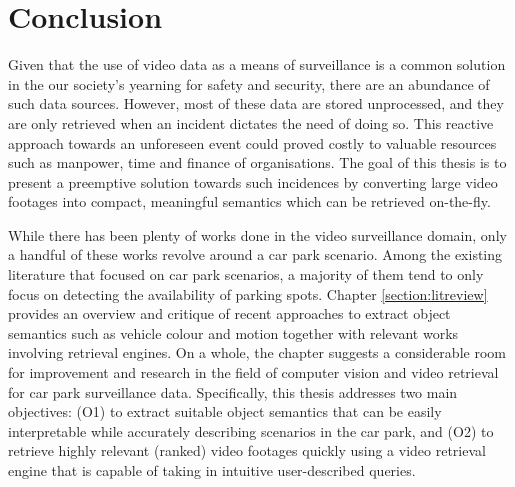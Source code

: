 
\chapter{Conclusion}
\label{section:conclusion}

Given that the use of video data as a means of surveillance is a common solution in the our society's yearning for safety and security, there are an abundance of such data sources. However, most of these data are stored unprocessed, and they are only retrieved when an incident dictates the need of doing so. This reactive approach towards an unforeseen event could proved costly to valuable resources such as manpower, time and finance of organisations. The goal of this thesis is to present a preemptive solution towards such incidences by converting large video footages into compact, meaningful semantics which can be retrieved on-the-fly. 

While there has been plenty of works done in the video surveillance domain, only a handful of these works revolve around a car park scenario. Among the existing literature that focused on car park scenarios, a majority of them tend to only focus on detecting the availability of parking spots.
Chapter \ref{section:litreview} provides an overview and critique of recent approaches to extract object semantics such as vehicle colour and motion together with relevant works involving retrieval engines. On a whole, the chapter suggests a considerable room for improvement and research in the field of computer vision and video retrieval for car park surveillance data.
Specifically, this thesis addresses two main objectives: (O1) to extract suitable object semantics that can be easily interpretable while accurately describing scenarios in the car park, and (O2) to retrieve highly relevant (ranked) video footages quickly using a video retrieval engine that is capable of taking in intuitive user-described queries.


